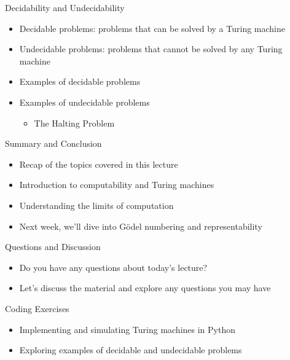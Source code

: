 \documentclass[presentation]{beamer}
\begin{document}
\begin{frame}[label={sec:orgab12469}]{Decidability and Undecidability}
\begin{itemize}
\item Decidable problems: problems that can be solved by a Turing machine
\item Undecidable problems: problems that cannot be solved by any Turing machine
\item Examples of decidable problems
\item Examples of undecidable problems
\begin{itemize}
\item The Halting Problem
\end{itemize}
\end{itemize}
\end{frame}

\begin{frame}[label={sec:orga08a17e}]{Summary and Conclusion}
\begin{itemize}
\item Recap of the topics covered in this lecture
\item Introduction to computability and Turing machines
\item Understanding the limits of computation
\item Next week, we'll dive into Gödel numbering and representability
\end{itemize}
\end{frame}

\begin{frame}[label={sec:org49ba3cf}]{Questions and Discussion}
\begin{itemize}
\item Do you have any questions about today's lecture?
\item Let's discuss the material and explore any questions you may have
\end{itemize}
\end{frame}

\begin{frame}[label={sec:org62bc066}]{Coding Exercises}
\begin{itemize}
\item Implementing and simulating Turing machines in Python
\item Exploring examples of decidable and undecidable problems
\end{itemize}
\end{frame}
\end{document}
